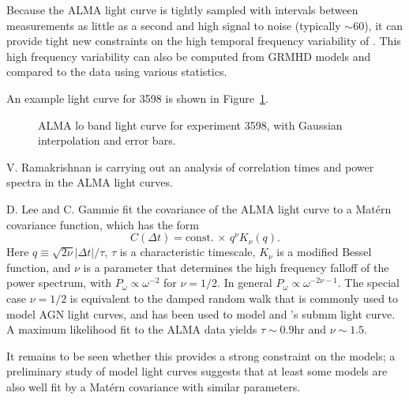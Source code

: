 \documentclass[twocolumn,tighten,dvipsnames,linenumbers]{aastex63}
\begin{document}
Because the ALMA light curve is tightly sampled with intervals  between measurements as little as a second and high signal to noise (typically $\sim 60$), it can provide tight new constraints on the high temporal frequency variability of \sgra.  This high frequency variability can also be computed from GRMHD models and compared to the data using various statistics.

An example light curve for 3598 is shown in Figure~\ref{fig:LC3598}.

\begin{figure}
  \caption{ALMA lo band light curve for experiment 3598, with Gaussian interpolation and error bars.}
  \label{fig:LC3598}
\end{figure}

V. Ramakrishnan is carrying out an analysis of correlation times and power spectra in the ALMA light curves.

D. Lee and C. Gammie fit the covariance of the ALMA light curve to a Mat\'ern covariance function, which has the form
\begin{equation}
  C(\Delta t) = \mbox{const.} \, \times \, q^\nu K_\nu(q).
\end{equation}
Here $q \equiv \sqrt{2\nu} |\Delta t|/\tau$, $\tau$ is a characteristic timescale, $K_\nu$ is a modified Bessel function, and $\nu$ is a parameter that determines the high frequency falloff of the power spectrum, with $P_\omega \propto \omega^{-2}$ for $\nu = 1/2$.  In general $P_\omega \propto \omega^{-2\nu - 1}$. The special case $\nu = 1/2$ is equivalent to the damped random walk that is commonly used to model AGN light curves, and has been used to model \sgra and 's submm light curve. A maximum likelihood fit to the ALMA data yields $\tau \sim 0.9$hr and $\nu \sim 1.5$.

It remains to be seen whether this provides a strong constraint on the models; a preliminary study of model light curves suggests that at least some models are also well fit by a Mat\'ern covariance with similar parameters.
\end{document}

